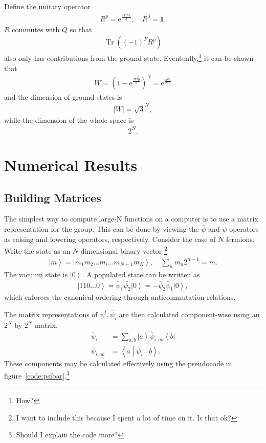 \documentclass[12pt]{article} %
\newcommand{\abs}[1]{\left|#1\right|}
\newcommand{\e}{\text{e}}
\newcommand{\ket}[1]{\left|#1\right\rangle}
\newcommand{\bra}[1]{\left\langle#1\right|}
\newcommand{\brakett}[3]{\left\langle#1\middle|#2\middle|#3\right\rangle}
\newcommand{\nn}{\nonumber\\}
\DeclareMathOperator{\Tr}{Tr}
\begin{document}
Define the unitary operator 
\begin{align}
R^p = \e^{\frac{2\pi ipF}{3}},\quad R^3 = \mathbb{1}.
\end{align}
$R$ commutes with $Q$ so that
\begin{align}
\Tr\left((-1)^FR^p\right)
\end{align}
also only has contributions from the ground state. Eventually,\footnote{How?} it can be shown that
\begin{align}
W = \left(1-\e^{\frac{2\pi ip}{3}}\right)^N = \e^{\frac{iN\pi}{den}}
\end{align}
and the dimension of ground states is 
\begin{align}
\abs{W} = \sqrt{3}^N,
\end{align}
while the dimension of the whole space is 
\begin{align}
2^N.
\end{align}

\section{Numerical Results}

\subsection{Building Matrices}\emph{}

The simplest way to compute large-N functions on a computer is to use a matrix representation for the group. This can be done by viewing the $\bar \psi$ and $\psi$ operators as raising and lowering operators, respectively. Consider the case of $N$ fermions. Write the state as an $N$-dimensional binary vector \footnote{I want to include this because I spent a lot of time on it. Is that ok?}
\begin{align}
\ket{m} = \ket{m_1m_2\dots m_i\dots m_{N-1}m_N}, \quad\sum_nm_n2^{n-1} =
	m.\label{eqn:2Nstate}
\end{align}
The vacuum state is $\ket{0}$. A populated state can be written as
\begin{align}
\ket{110\dots 0} = \bar\psi_1\bar{\psi_2}\ket{0} =-\bar\psi_2\bar\psi_1\ket{0},
\end{align}
which enforces the canonical ordering through anticommutation relations. 

The matrix representations of $\psi^i, \bar \psi_i$ are then calculated component-wise using an $2^N$ by $2^N$ matrix.
\begin{align}
\bar\psi_i &= \sum_{a,b}\ket{a}\bar\psi_{i,ab}\bra{b}\nn
\bar\psi_{i,ab} &= \brakett{a}{\bar\psi_i}{b}.\label{eqn:comps}
\end{align}
These components may be calculated effectively using the pseudocode in figure~\ref{code:psibar}.\footnote{Should I explain the code more?}
\end{document}
